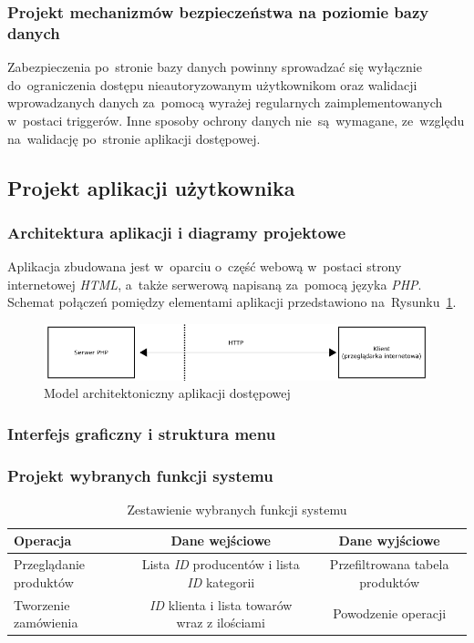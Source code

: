 \documentclass[a4paper, 12pt]{article}
\begin{document}
\subsubsection{Projekt mechanizmów bezpieczeństwa na poziomie bazy danych}
Zabezpieczenia po~stronie bazy danych powinny sprowadzać się wyłącznie do~ograniczenia dostępu nieautoryzowanym użytkownikom oraz walidacji wprowadzanych danych za~pomocą wyrażej regularnych zaimplementowanych w~postaci triggerów. Inne sposoby ochrony danych nie~są~wymagane, ze~względu na~walidację po~stronie aplikacji dostępowej.
\subsection{Projekt aplikacji użytkownika}
\subsubsection{Architektura aplikacji i diagramy projektowe}
Aplikacja zbudowana jest w~oparciu o~część webową w~postaci strony internetowej \textit{HTML}, a~także serwerową napisaną za~pomocą języka \textit{PHP}. Schemat połączeń pomiędzy elementami aplikacji przedstawiono na~Rysunku~\ref{fig:architekturaAplikacji}.

\begin{figure}[H]
	\includegraphics[width=14cm]{modelAplikacji.png}
	\caption[Architektura aplikacji]{Model architektoniczny aplikacji dostępowej}
	\label{fig:architekturaAplikacji}
\end{figure}

\subsubsection{Interfejs graficzny i struktura menu}
\subsubsection{Projekt wybranych funkcji systemu}
\begin{table}[H]
	\caption[Zestawienie wybranych funkcji systemu]{Zestawienie wybranych funkcji systemu}
	\label{tab:wybraneFunkcjeSystemu}
		\hskip-2.5cm\begin{tabular}{ l c c }
			Operacja & Dane wejściowe & Dane wyjściowe \\ \hline
			Przeglądanie produktów & Lista \textit{ID} producentów i lista \textit{ID} kategorii & Przefiltrowana tabela produktów \\ \hline
		    Tworzenie zamówienia & \textit{ID} klienta i lista towarów wraz z ilościami & Powodzenie operacji \\ \hline
		\end{tabular}
\end{table}
\end{document}
